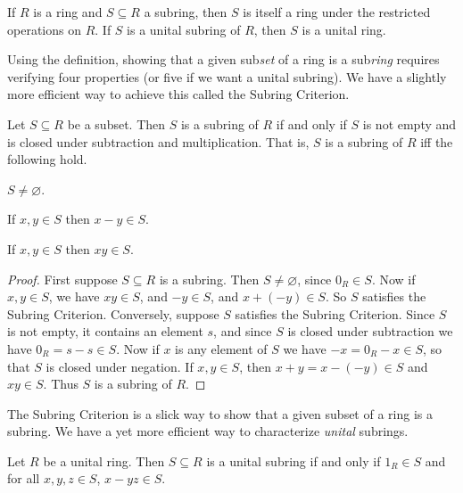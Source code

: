 \begin{prop} \label{prop:subring-is-ring}
If \(R\) is a ring and \(S \subseteq R\) a subring, then \(S\) is itself a ring under the restricted operations on \(R\). If \(S\) is a unital subring of \(R\), then \(S\) is a unital ring.
\end{prop}

Using the definition, showing that a given sub\emph{set} of a ring is a sub\emph{ring} requires verifying four properties (or five if we want a unital subring). We have a slightly more efficient way to achieve this called the Subring Criterion.

\begin{prop} \label{prop:subring-criterion}
Let \(S \subseteq R\) be a subset. Then \(S\) is a subring of \(R\) if and only if \(S\) is not empty and is closed under subtraction and multiplication. That is, \(S\) is a subring of \(R\) iff the following hold.
\begin{proplist*}
\item \(S \neq \varnothing\).
\item If \(x,y \in S\) then \(x-y \in S\).
\item If \(x,y \in S\) then \(xy \in S\).
\end{proplist*}
\end{prop}

\begin{proof}
First suppose \(S \subseteq R\) is a subring. Then \(S \neq \varnothing\), since \(0_R \in S\). Now if \(x,y \in S\), we have \(xy \in S\), and \(-y \in S\), and \(x + (-y) \in S\). So \(S\) satisfies the Subring Criterion. Conversely, suppose \(S\) satisfies the Subring Criterion. Since \(S\) is not empty, it contains an element \(s\), and since \(S\) is closed under subtraction we have \(0_R = s - s \in S\). Now if \(x\) is any element of \(S\) we have \(-x = 0_R - x \in S\), so that \(S\) is closed under negation. If \(x,y \in S\), then \(x+y = x-(-y) \in S\) and \(xy \in S\). Thus \(S\) is a subring of \(R\).
\end{proof}

The Subring Criterion is a slick way to show that a given subset of a ring is a subring. We have a yet more efficient way to characterize \emph{unital} subrings.

\begin{prop} \label{prop:unital-subring-criterion}
Let \(R\) be a unital ring. Then \(S \subseteq R\) is a unital subring if and only if \(1_R \in S\) and for all \(x,y,z \in S\), \(x-yz \in S\).
\end{prop}

